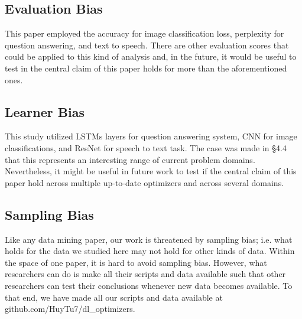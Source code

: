 \subsection{Evaluation Bias}

This paper employed the accuracy for image classification loss, perplexity for question answering, and text to speech. There are other evaluation scores that could be applied to this kind of analysis
and, in the future, it would be useful to test in the central claim of this paper holds for more than the aforementioned ones.

\subsection{Learner Bias}

This study utilized LSTMs layers for question answering system, CNN for image classifications, and ResNet for speech to text task. 
The case was made in \S4.4 that this represents an interesting range of current problem domains.
Nevertheless, it might be useful in future work to test if the central claim of this paper 
hold across multiple up-to-date optimizers and across several domains.

\subsection{Sampling Bias}

Like any data mining paper,
our work is threatened by sampling bias; i.e. what holds for the data we studied here may
not hold for other kinds of data. 
Within the space of one paper, it is hard to avoid sampling bias.
However, what researchers can do is make all their scripts and data available
such that other researchers can test their conclusions whenever new data becomes available. To that end, we have made all our scripts and data available at github.com/HuyTu7/dl\_optimizers.